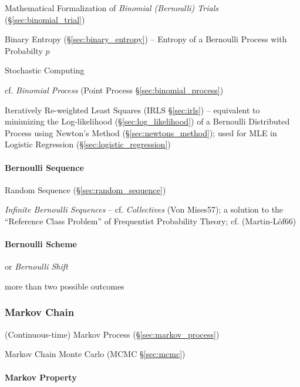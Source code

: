 Mathematical Formalization of \emph{Binomial (Bernoulli) Trials}
(\S\ref{sec:binomial_trial})

Binary Entropy (\S\ref{sec:binary_entropy}) -- Entropy of a Bernoulli Process
with Probabilty $p$

Stochastic Computing

cf. \emph{Binomial Process} (Point Process \S\ref{sec:binomial_process})

Iteratively Re-weighted Least Squares (IRLS \S\ref{sec:irls}) -- equivalent to
minimizing the Log-likelihood (\S\ref{sec:log_likelihood}) of a Bernoulli
Distributed Process using Newton's Method (\S\ref{sec:newtons_method}); used for
MLE in Logistic Regression (\S\ref{sec:logistic_regression})



\paragraph{Bernoulli Sequence}\label{sec:bernoulli_sequence}\hfill

Random Sequence (\S\ref{sec:random_sequence})

\emph{Infinite Bernoulli Sequences} -- cf. \emph{Collectives} (Von Mises57); a
solution to the ``Reference Class Problem'' of Frequentist Probability Theory;
cf. (Martin-L\"of66)



\paragraph{Bernoulli Scheme}\label{sec:bernoulli_scheme}\hfill

or \emph{Bernoulli Shift}

more than two possible outcomes



\subsubsection{Markov Chain}\label{sec:markov_chain}

\fist (Continuous-time) Markov Process (\S\ref{sec:markov_process})

Markov Chain Monte Carlo (MCMC \S\ref{sec:mcmc})



\paragraph{Markov Property}\label{sec:markov_property}\hfill

